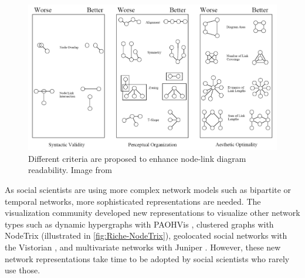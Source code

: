 \begin{figure}
    \centering %
    \includegraphics[width=1\textwidth]{static/figures/RelatedWork/Kosak-nodelinkdiagramMetrics}
    \caption{Different criteria are proposed to enhance node-link diagram readability. Image from \cite{kosakAutomatingLayoutNetwork1994}}
    \label{fig:kosak-graph-drawing}
\end{figure}

As social scientists are using more complex network models such as bipartite or temporal networks, more sophisticated representations are needed.
The visualization community developed new representations to visualize other network types such as dynamic hypergraphs with PAOHVis \cite{valdiviaAnalyzingDynamicHypergraphs2021}, clustered graphs with NodeTrix \cite{henryNodeTrixHybridVisualization2007} (illustrated in \autoref{fig:Riche-NodeTrix}), geolocated social networks with the Vistorian \cite{serranomolineroUnderstandingUseVistorian2017}, and multivariate networks with Juniper \cite{nobreJuniperTreeTable2019}.
However, these new network representations take time to be adopted by social scientists who rarely use those.


